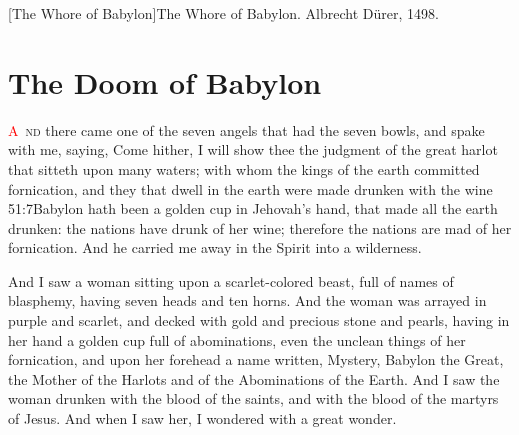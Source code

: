 [The Whore of Babylon]{The Whore of Babylon. Albrecht Dürer, 1498.}

\chapter{The Doom of Babylon}
\lettrine[lines=3,slope=0.5em]{\textcolor{red}{A}}{\ nd} there came one of the seven angels that had the seven bowls, and spake with me, saying, Come hither, I will show thee the judgment of the great harlot that sitteth upon many waters;%
 with whom the kings of the earth committed fornication,%
 and they that dwell in the earth were made drunken with the wine%
					  {51:7}{Babylon hath been a golden cup in Jehovah’s hand, that made all the earth drunken: the nations have drunk of her wine; therefore the nations are mad}
 of her fornication.%
 And he carried me away in the Spirit into a wilderness. 

And I saw a woman sitting upon a scarlet-colored beast, full of names of blasphemy, having seven heads and ten horns. 
 And the woman was arrayed in purple and scarlet, and decked with gold and precious stone and pearls,%
 having in her hand a golden cup full of abominations, even the unclean things of her fornication, 
 and upon her forehead a name written, Mystery, Babylon the Great, the Mother of the Harlots and of the Abominations of the Earth. 
 And I saw the woman drunken with the blood of the saints, and with the blood of the martyrs of Jesus. And when I saw her, I wondered with a great wonder. 

